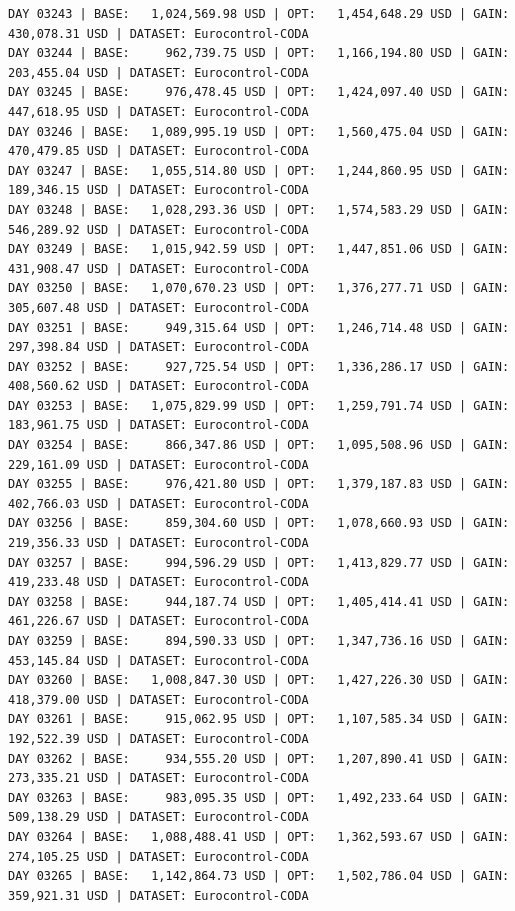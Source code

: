 \documentclass[11pt,a4paper]{article}
\begin{document}
\begin{verbatim}
DAY 03243 | BASE:   1,024,569.98 USD | OPT:   1,454,648.29 USD | GAIN: 430,078.31 USD | DATASET: Eurocontrol-CODA
DAY 03244 | BASE:     962,739.75 USD | OPT:   1,166,194.80 USD | GAIN: 203,455.04 USD | DATASET: Eurocontrol-CODA
DAY 03245 | BASE:     976,478.45 USD | OPT:   1,424,097.40 USD | GAIN: 447,618.95 USD | DATASET: Eurocontrol-CODA
DAY 03246 | BASE:   1,089,995.19 USD | OPT:   1,560,475.04 USD | GAIN: 470,479.85 USD | DATASET: Eurocontrol-CODA
DAY 03247 | BASE:   1,055,514.80 USD | OPT:   1,244,860.95 USD | GAIN: 189,346.15 USD | DATASET: Eurocontrol-CODA
DAY 03248 | BASE:   1,028,293.36 USD | OPT:   1,574,583.29 USD | GAIN: 546,289.92 USD | DATASET: Eurocontrol-CODA
DAY 03249 | BASE:   1,015,942.59 USD | OPT:   1,447,851.06 USD | GAIN: 431,908.47 USD | DATASET: Eurocontrol-CODA
DAY 03250 | BASE:   1,070,670.23 USD | OPT:   1,376,277.71 USD | GAIN: 305,607.48 USD | DATASET: Eurocontrol-CODA
DAY 03251 | BASE:     949,315.64 USD | OPT:   1,246,714.48 USD | GAIN: 297,398.84 USD | DATASET: Eurocontrol-CODA
DAY 03252 | BASE:     927,725.54 USD | OPT:   1,336,286.17 USD | GAIN: 408,560.62 USD | DATASET: Eurocontrol-CODA
DAY 03253 | BASE:   1,075,829.99 USD | OPT:   1,259,791.74 USD | GAIN: 183,961.75 USD | DATASET: Eurocontrol-CODA
DAY 03254 | BASE:     866,347.86 USD | OPT:   1,095,508.96 USD | GAIN: 229,161.09 USD | DATASET: Eurocontrol-CODA
DAY 03255 | BASE:     976,421.80 USD | OPT:   1,379,187.83 USD | GAIN: 402,766.03 USD | DATASET: Eurocontrol-CODA
DAY 03256 | BASE:     859,304.60 USD | OPT:   1,078,660.93 USD | GAIN: 219,356.33 USD | DATASET: Eurocontrol-CODA
DAY 03257 | BASE:     994,596.29 USD | OPT:   1,413,829.77 USD | GAIN: 419,233.48 USD | DATASET: Eurocontrol-CODA
DAY 03258 | BASE:     944,187.74 USD | OPT:   1,405,414.41 USD | GAIN: 461,226.67 USD | DATASET: Eurocontrol-CODA
DAY 03259 | BASE:     894,590.33 USD | OPT:   1,347,736.16 USD | GAIN: 453,145.84 USD | DATASET: Eurocontrol-CODA
DAY 03260 | BASE:   1,008,847.30 USD | OPT:   1,427,226.30 USD | GAIN: 418,379.00 USD | DATASET: Eurocontrol-CODA
DAY 03261 | BASE:     915,062.95 USD | OPT:   1,107,585.34 USD | GAIN: 192,522.39 USD | DATASET: Eurocontrol-CODA
DAY 03262 | BASE:     934,555.20 USD | OPT:   1,207,890.41 USD | GAIN: 273,335.21 USD | DATASET: Eurocontrol-CODA
DAY 03263 | BASE:     983,095.35 USD | OPT:   1,492,233.64 USD | GAIN: 509,138.29 USD | DATASET: Eurocontrol-CODA
DAY 03264 | BASE:   1,088,488.41 USD | OPT:   1,362,593.67 USD | GAIN: 274,105.25 USD | DATASET: Eurocontrol-CODA
DAY 03265 | BASE:   1,142,864.73 USD | OPT:   1,502,786.04 USD | GAIN: 359,921.31 USD | DATASET: Eurocontrol-CODA

\end{verbatim}
\end{document}
